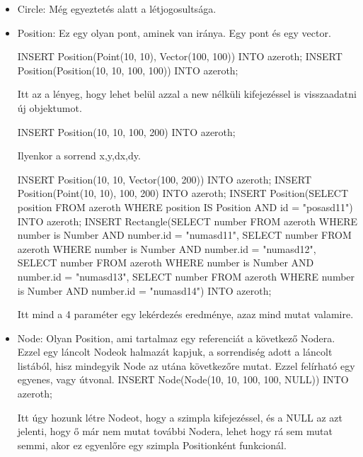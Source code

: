 \begin{itemize}
\item Circle: Még egyeztetés alatt a létjogosultsága.


\item Position: Ez egy olyan pont, aminek van iránya. Egy pont és egy vector.
\begin{sql}
INSERT Position(Point(10, 10),  Vector(100, 100)) INTO azeroth;
INSERT Position(Position(10, 10, 100, 100)) INTO azeroth;
\end{sql}

Itt az a lényeg, hogy lehet belül azzal a new nélküli kifejezéssel is visszaadatni új objektumot.

\begin{sql}
INSERT Position(10, 10, 100, 200) INTO azeroth;
\end{sql}
Ilyenkor a sorrend x,y,dx,dy.
\begin{sql}
INSERT Position(10, 10, Vector(100, 200)) INTO azeroth;
INSERT Position(Point(10, 10), 100, 200) INTO azeroth;
INSERT Position(SELECT position FROM azeroth WHERE position IS Position AND id = "posasd11") INTO azeroth;
INSERT Rectangle(SELECT number FROM azeroth WHERE number is Number AND number.id = "numasd11", SELECT number FROM azeroth WHERE number is Number AND number.id = "numasd12", SELECT number FROM azeroth WHERE number is Number AND number.id = "numasd13", SELECT number FROM azeroth WHERE number is Number AND number.id = "numasd14") INTO azeroth;
\end{sql}

Itt mind a 4 paraméter egy lekérdezés eredménye, azaz mind mutat valamire.

\item Node: Olyan Position, ami tartalmaz egy referenciát a következő Nodera. Ezzel egy láncolt Nodeok halmazát kapjuk, a sorrendiség adott a láncolt listából, hisz mindegyik Node az utána következőre mutat. Ezzel felírható egy egyenes, vagy útvonal. 
INSERT Node(Node(10, 10, 100, 100, NULL)) INTO azeroth; 

Itt úgy hozunk létre Nodeot, hogy a szimpla kifejezéssel, és a NULL az azt jelenti, hogy ő már nem mutat további Nodera, lehet hogy rá sem mutat semmi, akor ez egyenlőre egy szimpla Positionként funkcionál.


\end{itemize}
